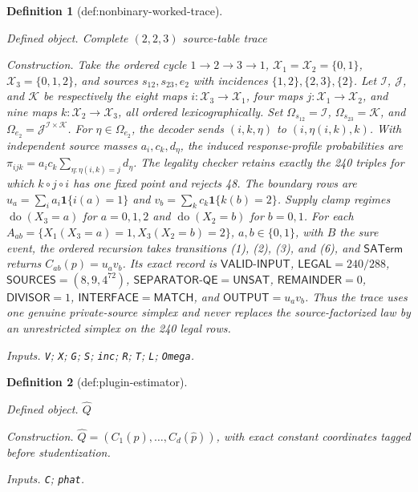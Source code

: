\documentclass{article}
\newtheorem{definition}{Definition}
\begin{document}
\begin{definition}[def:nonbinary-worked-trace]\label{def:nonbinary-worked-trace}
\par\smallskip\noindent\emph{Defined object.} Complete \((2,2,3)\) source-table trace
\par\smallskip\noindent\emph{Construction.} Take the ordered cycle \(1\to2\to3\to1\), \(\mathcal X_1=\mathcal X_2=\{0,1\}\), \(\mathcal X_3=\{0,1,2\}\), and sources \(s_{12},s_{23},e_2\) with incidences \(\{1,2\},\{2,3\},\{2\}\).  Let \(\mathcal I\), \(\mathcal J\), and \(\mathcal K\) be respectively the eight maps \(i:\mathcal X_3\to\mathcal X_1\), four maps \(j:\mathcal X_1\to\mathcal X_2\), and nine maps \(k:\mathcal X_2\to\mathcal X_3\), all ordered lexicographically.  Set \(\Omega_{s_{12}}=\mathcal I\), \(\Omega_{s_{23}}=\mathcal K\), and \(\Omega_{e_2}=\mathcal J^{\mathcal I\times\mathcal K}\).  For \(\eta\in\Omega_{e_2}\), the decoder sends \((i,k,\eta)\) to \((i,\eta(i,k),k)\).  With independent source masses \(a_i,c_k,d_\eta\), the induced response-profile probabilities are \(\pi_{ijk}=a_ic_k\sum_{\eta:\eta(i,k)=j}d_\eta\).  The legality checker retains exactly the 240 triples for which \(k\circ j\circ i\) has one fixed point and rejects 48.  The boundary rows are \(u_a=\sum_i a_i\mathbf1\{i(a)=1\}\) and \(v_b=\sum_k c_k\mathbf1\{k(b)=2\}\).  Supply clamp regimes \(\operatorname{do}(X_3=a)\) for \(a=0,1,2\) and \(\operatorname{do}(X_2=b)\) for \(b=0,1\).  For each \(A_{ab}=\{X_1(X_3=a)=1,X_3(X_2=b)=2\}\), \(a,b\in\{0,1\}\), with \(B\) the sure event, the ordered recursion takes transitions (1), (2), (3), and (6), and \(\mathsf{SATerm}\) returns \(C_{ab}(p)=u_av_b\).  Its exact record is \(\mathsf{VALID\mbox{-}INPUT}\), \(\mathsf{LEGAL}=240/288\), \(\mathsf{SOURCES}=(8,9,4^{72})\), \(\mathsf{SEPARATOR\mbox{-}QE}=\mathsf{UNSAT}\), \(\mathsf{REMAINDER}=0\), \(\mathsf{DIVISOR}=1\), \(\mathsf{INTERFACE}=\mathsf{MATCH}\), and \(\mathsf{OUTPUT}=u_av_b\).  Thus the trace uses one genuine private-source simplex and never replaces the source-factorized law by an unrestricted simplex on the 240 legal rows.
\par\smallskip\noindent\emph{Inputs.} \texttt{V}; \texttt{X}; \texttt{G}; \texttt{S}; \texttt{inc}; \texttt{R}; \texttt{T}; \texttt{L}; \texttt{Omega}.
\end{definition}

\begin{definition}[def:plugin-estimator]\label{def:plugin-estimator}
\par\smallskip\noindent\emph{Defined object.} \(\widehat Q\)
\par\smallskip\noindent\emph{Construction.} \(\widehat Q=(C_1(\widehat p),\ldots,C_d(\widehat p))\), with exact constant coordinates tagged before studentization.
\par\smallskip\noindent\emph{Inputs.} \texttt{C}; \texttt{phat}.
\end{definition}
\end{document}
